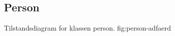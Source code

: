 \subsection{Person}
\label{sec:person}

            {Tilstandsdiagram for klassen person.}
            {fig:person-adfaerd}
